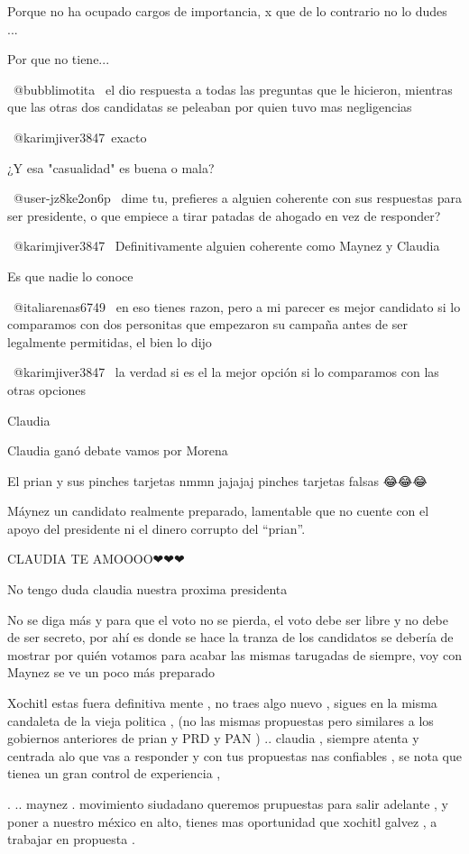 Porque no ha ocupado cargos de importancia, x que de lo contrario no lo dudes ...

Por que no tiene...

 @bubblimotita  el dio respuesta a todas las preguntas que le hicieron, mientras que las otras dos candidatas se peleaban por quien tuvo mas negligencias

​ @karimjiver3847 exacto

¿Y esa "casualidad" es buena o mala?

 @user-jz8ke2on6p  dime tu, prefieres a alguien coherente con sus respuestas para ser presidente, o que empiece a tirar patadas de ahogado en vez de responder?

 @karimjiver3847  Definitivamente alguien coherente como Maynez y Claudia

Es que nadie lo conoce

 @italiarenas6749  en eso tienes razon, pero a mi parecer es mejor candidato si lo comparamos con dos personitas que empezaron su campaña antes de ser legalmente permitidas, el bien lo dijo

 @karimjiver3847  la verdad si es el la mejor opción si lo comparamos con las otras opciones

Claudia 🎉

Claudia ganó debate  vamos por Morena

El prian y sus pinches tarjetas nmmn jajajaj pinches tarjetas falsas 😂😂😂

Máynez un candidato realmente preparado, lamentable que no cuente con el apoyo del presidente ni el dinero corrupto del “prian”.

CLAUDIA TE AMOOOO❤❤❤

No tengo duda claudia nuestra proxima presidenta

No se diga más y para que el voto no se pierda, el voto debe ser libre y no debe de ser secreto, por ahí es donde se hace la tranza de los candidatos se debería de mostrar por quién votamos para acabar las mismas tarugadas de siempre, voy con Maynez se ve un poco más preparado

Xochitl estas fuera definitiva mente , no traes algo nuevo , sigues en la misma candaleta de la vieja politica , (no las mismas propuestas pero similares  a los gobiernos anteriores de prian y PRD y PAN ) 
..   claudia , siempre atenta y centrada alo que vas a responder y con tus propuestas nas confiables  , se nota que tienea un gran control de experiencia , 

. .. maynez . movimiento siudadano  queremos prupuestas para salir adelante , y poner a nuestro méxico en alto, tienes mas oportunidad que xochitl galvez , a trabajar en propuesta .  
 
